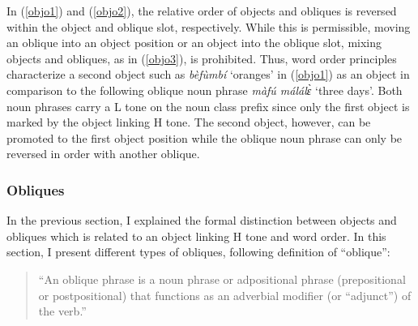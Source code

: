 \noindent In (\ref{objo1}) and (\ref{objo2}), the relative order of objects and obliques is reversed within the object and oblique slot, respectively. While this is permissible, moving an oblique into an object position or an object into the oblique slot, mixing objects and obliques, as in (\ref{objo3}), is prohibited. Thus, word order principles characterize a second object such as {\itshape bèfùmbí} `oranges' in (\ref{objo1}) as an object in comparison to the following oblique noun phrase {\itshape màfú málálɛ̀} `three days'. Both noun phrases carry a L tone on the noun class prefix since only the first object is marked by the object linking H tone. The second object, however, can be promoted to the first object position while the oblique noun phrase can only be reversed in order with another oblique.












\subsubsection{Obliques}
\label{sec:OBL}

In the previous section, I explained the formal distinction between objects and obliques which is related to an object linking H tone and word order.
In this section, I present different types of obliques, following
   definition of ``oblique'':
\begin{quote}
``An oblique phrase is a noun phrase or adpositional phrase (prepositional or postpositional) that functions as an adverbial modifier (or ``adjunct'') of the verb.'' \end{quote}

